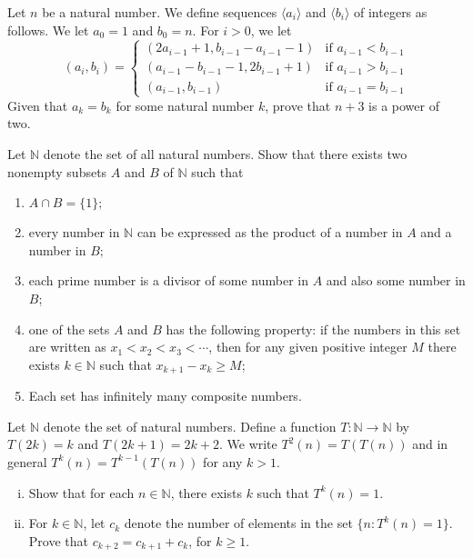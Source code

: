 \documentclass[problems.tex]{subfile}
\begin{document}
	\begin{problem}
		Let $n$ be a natural number. We define sequences $\langle a_i\rangle$ and $\langle b_i\rangle$ of integers as follows. We let $a_0=1$ and $b_0=n$. For $i>0$, we let $$\left( a_i,b_i\right)=\begin{cases} \left(2a_{i-1}+1,b_{i-1}-a_{i-1}-1\right) & \text{if } a_{i-1}<b_{i-1}\\ \left( a_{i-1}-b_{i-1}-1,2b_{i-1}+1\right) & \text{if } a_{i-1}>b_{i-1}\\ \left(a_{i-1},b_{i-1}\right) & \text{if } a_{i-1}=b_{i-1}\end{cases}$$ Given that $a_k=b_k$ for some natural number $k$, prove that $n+3$ is a power of two. %
	\end{problem}

	\begin{problem}
		Let $\mathbb N$ denote the set of all natural numbers. Show that there exists two nonempty subsets $A$ and $B$ of $\mathbb N$ such that
		\begin{enumerate}
			\item $A\cap B=\{1\};$
			\item every number in $\mathbb N$ can be expressed as the product of a number in $A$ and a number in $B$;
			\item each prime number is a divisor of some number in $A$ and also some number in $B$;
			\item one of the sets $A$ and $B$ has the following property: if the numbers in this set are written as $x_1<x_2<x_3<\cdots$, then for any given positive integer $M$ there exists $k\in \mathbb N$ such that $x_{k+1}-x_k\ge M$;
			\item Each set has infinitely many composite numbers.
		\end{enumerate}
	\end{problem}

	\begin{problem}
		Let $\mathbb{N}$ denote the set of natural numbers. Define a function $T:\mathbb{N}\rightarrow\mathbb{N}$ by $T(2k)=k$ and $T(2k+1)=2k+2$. We write $T^2(n)=T(T(n))$ and in general $T^k(n)=T^{k-1}(T(n))$ for any $k>1$.
		\begin{enumerate}[(i)]
			\item Show that for each $n\in\mathbb{N}$, there exists $k$ such that $T^k(n)=1$.
			\item For $k\in\mathbb{N}$, let $c_k$ denote the number of elements in the set $\{n: T^k(n)=1\}$. Prove that $c_{k+2}=c_{k+1}+c_k$, for $k\ge 1$.
		\end{enumerate}
	\end{problem}
\end{document}
